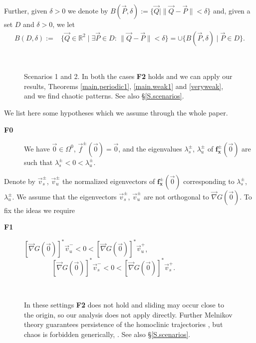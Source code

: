 \documentclass[10pt]{article}
\numberwithin{equation}{section}
\def\la{\lambda}
\def\na{\vec{\nabla}}
\def\R{{\mathbb R}}
\def\Q{\vec{Q}}
\def\f{\vec{f}}
\newcommand\bs[1]{{\boldsymbol{#1}}}
\newcommand\assump[1]{{\rm\textbf{#1}}}
\theoremstyle{definition}
\theoremstyle{remark}
\begin{document}
Further, given $\delta>0$ we denote by $B(\vec{P},\delta):=\{\Q \mid \|\Q-\vec{P}\| < \delta \}$ and,
given a set $D$ and $\delta>0$, we let
\begin{equation*}
  \begin{split}
     B(D, \delta):= &  \{ \vec{Q} \in \R^2 \mid   \exists \vec{P} \in D : \, \|\vec{Q}-\vec{P} \| <  \delta \}= \cup \{ B(\vec{P}, \delta)
 \mid \vec{P} \in D \}.
  \end{split}
\end{equation*}

\begin{figure}[t!]
\begin{center}
	\\
\end{center}
\caption{Scenarios 1 and 2. In both the cases \assump{F2} holds and
we can apply our results, Theorems \ref{main.periodic1},
 \ref{main.weak1} and \ref{veryweak}, and we find chaotic patterns. See also \S \ref{S.scenarios}.
}
\label{scenario123}
\end{figure}



We list here some hypotheses which we assume through the whole paper.

\begin{description}
	\item[\assump{F0}] We have $\vec{0}\in\Omega^0$,  $\f^\pm(\vec{0})=\vec{0}$, and the eigenvalues $\la_s^\pm$, $\la_u^\pm$ of
$\bs{f_x^\pm}(\vec{0})$ are such that
$\la_s^\pm<0<\la_u^\pm$.
\end{description}

Denote by $\vec{v}_s^{\pm}$, $\vec{v}_u^{\pm}$ the normalized eigenvectors of $\bs{f_x^\pm}(\vec{0})$ corresponding to $\la_s^\pm$,
$\la_u^\pm$.
 We assume that the eigenvectors $\vec{v}_s^{\pm}$, $\vec{v}_u^{\pm}$ are not orthogonal to $\na G(\vec{0})$. To fix the ideas we require
\begin{description}
	\item[\assump{F1}]   $[\na G(\vec{0})]^*\vec{v}^{-}_u    <0<[\na G(\vec{0})]^*\vec{v}^{+}_u$,
$\qquad \qquad [\na G(\vec{0})]^*\vec{v}^{-}_s<0<[\na G(\vec{0})]^*\vec{v}^{+}_s$.
\end{description}


\begin{figure}[t!]
\begin{center}
	 \\
\end{center}
\caption{In these settings \assump{F2} does not hold and sliding may occur close to the origin, so our analysis does not apply directly. Further Melnikov theory guarantees persistence of the homoclinic trajectories
  \cite{CaFr}, but chaos is forbidden  generically,  \cite{FrPo}. See also \S \ref{S.scenarios}.}
\label{scenario45}
\end{figure}
\end{document}
